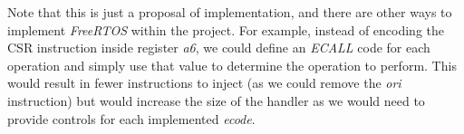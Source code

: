 Note that this is just a proposal of implementation, and there are other ways to
implement \textit{FreeRTOS} within the project. For example, instead of encoding
the CSR instruction inside register \textit{a6}, we could define an \textit{ECALL}
code for each operation and simply use that value to determine the operation to perform.
This would result in fewer instructions to inject (as we could remove the \textit{ori}
instruction) but would increase the size of the handler as we would need to provide
controls for each implemented \textit{ecode}.